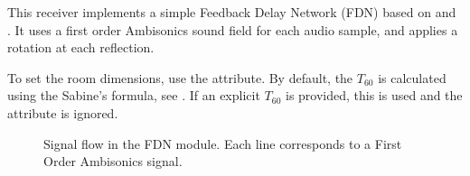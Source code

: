 This receiver implements a simple Feedback Delay Network (FDN) based
on \citet{Schroeder1962} and \citet{Rocchesso1997}. It uses a first
order Ambisonics sound field for each audio sample, and applies a
rotation at each reflection.

To set the room
dimensions, use the  attribute. By default, the
$T_{60}$ is calculated using the Sabine's formula, see
. If an explicit $T_{60}$ is provided, this is used
and the  attribute is ignored.

\begin{figure}[htb]
\centering
{}
\caption{Signal flow in the FDN module. Each line corresponds to a First Order Ambisonics signal.}
\label{fig:fdn}
\end{figure}


